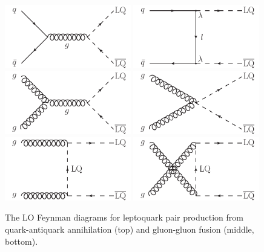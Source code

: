 \documentclass[12pt]{thesis}  %
\begin{document}
\begin{figure}[hbt]
\begin{center}
\includegraphics[width=0.49\textwidth]{figures/LO_FD_LQ_pair_a.pdf}
\includegraphics[width=0.49\textwidth]{figures/LO_FD_LQ_pair_b.pdf}
\includegraphics[width=0.49\textwidth]{figures/LO_FD_LQ_pair_c.pdf}
\includegraphics[width=0.49\textwidth]{figures/LO_FD_LQ_pair_d.pdf}
\includegraphics[width=0.49\textwidth]{figures/LO_FD_LQ_pair_e.pdf}
\includegraphics[width=0.49\textwidth]{figures/LO_FD_LQ_pair_f.pdf}
\caption{The LO Feynman diagrams for leptoquark pair production from quark-antiquark annihilation (top) and gluon-gluon fusion (middle, bottom).}
\label{fig:lq-diagrams}
\end{center}
\end{figure}
\end{document}
